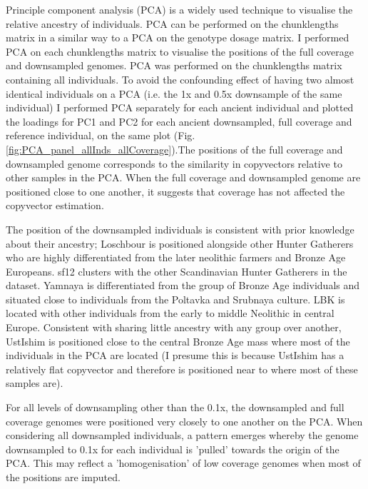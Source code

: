 Principle component analysis (PCA) is a widely used technique to visualise the relative ancestry of individuals. PCA can be performed on the chunklengths matrix in a similar way to a PCA on the genotype dosage matrix. I performed PCA on each chunklengths matrix to visualise the positions of the full coverage and downsampled genomes. PCA was performed on the chunklengths matrix containing all individuals. To avoid the confounding effect of having two almost identical individuals on a PCA (i.e. the 1x and 0.5x downsample of the same individual) I performed PCA separately for each ancient individual and plotted the loadings for PC1 and PC2 for each ancient downsampled, full coverage and reference individual, on the same plot (Fig. \ref{fig:PCA_panel_allInds_allCoverage}).The positions of the full coverage and downsampled genome corresponds to the similarity in copyvectors relative to other samples in the PCA. When the full coverage and downsampled genome are positioned close to one another, it suggests that coverage has not affected the copyvector estimation. 

The position of the downsampled individuals is consistent with prior knowledge about their ancestry; Loschbour is positioned alongside other Hunter Gatherers who are highly differentiated from the later neolithic farmers and Bronze Age Europeans. sf12 clusters with the other Scandinavian Hunter Gatherers in the dataset. Yamnaya is differentiated from the group of Bronze Age individuals and situated close to individuals from the Poltavka and Srubnaya culture. LBK is located with other individuals from the early to middle Neolithic in central Europe. Consistent with sharing little ancestry with any group over another, UstIshim is positioned close to the central Bronze Age mass where most of the individuals in the PCA are located (I presume this is because UstIshim has a relatively flat copyvector and therefore is positioned near to where most of these samples are). 

For all levels of downsampling other than the 0.1x, the downsampled and full coverage genomes were positioned very closely to one another on the PCA. When considering all downsampled individuals, a pattern emerges whereby the genome downsampled to 0.1x for each individual is 'pulled' towards the origin of the PCA. This may reflect a 'homogenisation' of low coverage genomes when most of the positions are imputed. 

